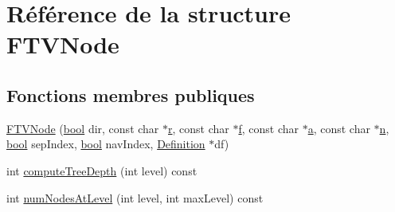 \hypertarget{struct_f_t_v_node}{}\section{Référence de la structure F\+T\+V\+Node}
\label{struct_f_t_v_node}
\subsection*{Fonctions membres publiques}
\begin{DoxyCompactItemize}
\item 
\hyperlink{struct_f_t_v_node_a8dc5d27f90a72e693407fed361e0370e}{F\+T\+V\+Node} (\hyperlink{qglobal_8h_a1062901a7428fdd9c7f180f5e01ea056}{bool} dir, const char $\ast$\hyperlink{060__command__switch_8tcl_a0a0bd3dc69dd06934c4e6362155e0ace}{r}, const char $\ast$\hyperlink{060__command__switch_8tcl_af6830d2c644b45088ea8f1f74a46b778}{f}, const char $\ast$\hyperlink{060__command__switch_8tcl_ab08ae027fc5777bc4f0629f1b60b35db}{a}, const char $\ast$\hyperlink{060__command__switch_8tcl_acdde3cd86eb2421ce8dbb2e85227d368}{n}, \hyperlink{qglobal_8h_a1062901a7428fdd9c7f180f5e01ea056}{bool} sep\+Index, \hyperlink{qglobal_8h_a1062901a7428fdd9c7f180f5e01ea056}{bool} nav\+Index, \hyperlink{class_definition}{Definition} $\ast$df)
\item 
int \hyperlink{struct_f_t_v_node_aa61d35f79cdec61efe6fb8b6d9880524}{compute\+Tree\+Depth} (int level) const 
\item 
int \hyperlink{struct_f_t_v_node_ad036a81f84024cc3b16cd6cfa0fb4a63}{num\+Nodes\+At\+Level} (int level, int max\+Level) const 
\end{DoxyCompactItemize}
